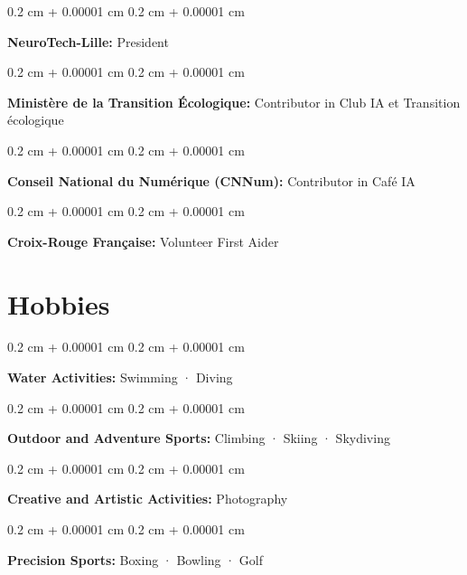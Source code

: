 \documentclass[10pt, letterpaper]{article}
\newenvironment{onecolentry}{
    \begin{adjustwidth}{
        0.2 cm + 0.00001 cm
    }{
        0.2 cm + 0.00001 cm
    }
}{
    \end{adjustwidth}
} %
\begin{document}
    \begin{onecolentry}
        \textbf{NeuroTech-Lille:} President
    \end{onecolentry}
    \vspace{0.2 cm}

    \begin{onecolentry}
        \textbf{Ministère de la Transition Écologique:} Contributor in Club IA et Transition écologique
    \end{onecolentry}
    \vspace{0.2 cm}

    \begin{onecolentry}
        \textbf{Conseil National du Numérique (CNNum):} Contributor in Café IA
    \end{onecolentry}
    \vspace{0.2 cm}

    \begin{onecolentry}
        \textbf{Croix-Rouge Française:} Volunteer First Aider
    \end{onecolentry}

    \section{Hobbies}
        \begin{onecolentry}
            \textbf{Water Activities:} Swimming · Diving
        \end{onecolentry}
        \vspace{0.2 cm}

        \begin{onecolentry}
            \textbf{Outdoor and Adventure Sports:} Climbing · Skiing · Skydiving
        \end{onecolentry}
        \vspace{0.2 cm}
        
        \begin{onecolentry}
            \textbf{Creative and Artistic Activities:} Photography
        \end{onecolentry}
        \vspace{0.2 cm}

        \begin{onecolentry}
            \textbf{Precision Sports:} Boxing · Bowling · Golf
        \end{onecolentry}
        \vspace{0.2 cm}


\end{document}
